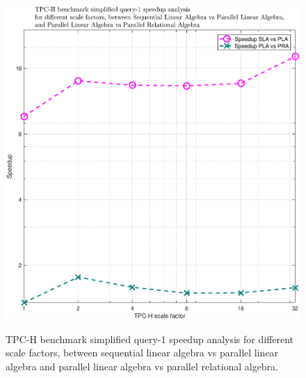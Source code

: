 \begin{figure}[H]
\centering
\caption{TPC-H benchmark simplified query-1 speedup analysis for different scale factors, between sequential linear algebra vs parallel linear algebra and parallel linear algebra vs parallel relational algebra.}
\includegraphics[width=0.95\columnwidth]{eps/speedup.eps}
\label{fig:speedup_la_vs_ra_parallel}
\end{figure}



